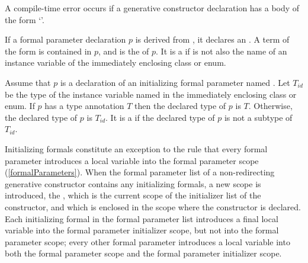 \documentclass[makeidx]{article}
\begin{document}
\LMHash{}%
A compile-time error occurs if a generative constructor declaration
has a body of the form `'.


\LMHash{}%
If a formal parameter declaration $p$ is derived from
,
it declares an .
A term of the form  is contained in $p$,
and \id{} is the  of $p$.
It is a  if \id{} is not also the name of
an instance variable of the immediately enclosing class or enum.


\LMHash{}%
Assume that $p$ is a declaration of an initializing formal parameter named \id.
Let $T_{id}$ be the type of the instance variable named \id{} in
the immediately enclosing class or enum.
If $p$ has a type annotation $T$ then the declared type of $p$ is $T$.
Otherwise, the declared type of $p$ is $T_{id}$.
It is a  if the declared type of $p$
is not a subtype of $T_{id}$.

\LMHash{}%
Initializing formals constitute an exception to the rule that
every formal parameter introduces a local variable into
the formal parameter scope (\ref{formalParameters}).
When the formal parameter list of a non-redirecting generative constructor
contains any initializing formals, a new scope is introduced, the
,
which is the current scope of the initializer list of the constructor,
and which is enclosed in the scope where the constructor is declared.
Each initializing formal in the formal parameter list
introduces a final local variable into the formal parameter initializer scope,
but not into the formal parameter scope;
every other formal parameter introduces a local variable into
both the formal parameter scope and the formal parameter initializer scope.

\end{document}
